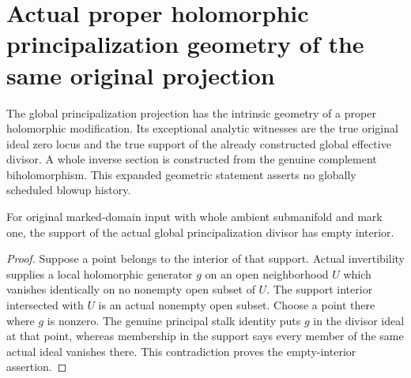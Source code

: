 \section{Actual proper holomorphic principalization geometry of the same original projection}

The global principalization projection has the intrinsic geometry of a
proper holomorphic modification.  Its exceptional analytic witnesses are
the true original ideal zero locus and the true support of the already
constructed global effective divisor.  A whole inverse section is
constructed from the genuine complement biholomorphism.  This expanded
geometric statement asserts no globally scheduled blowup history.

\begin{lemma}
\label{hir:original-global-principalization-divisor-support-thin}
\leanok
{}
For original marked-domain input with whole ambient submanifold and mark
one, the support of the actual global principalization divisor has empty
interior.
\end{lemma}
\begin{proof}
Suppose a point belongs to the interior of that support.  Actual
invertibility supplies a local holomorphic generator $g$ on an open
neighborhood $U$ which vanishes identically on no nonempty open subset
of $U$.  The support interior intersected with $U$ is an actual
nonempty open subset.  Choose a point there where $g$ is nonzero.
The genuine principal stalk identity puts $g$ in the divisor ideal at
that point, whereas membership in the support says every member of
the same actual ideal vanishes there.  This contradiction proves the
empty-interior assertion.
\end{proof}

